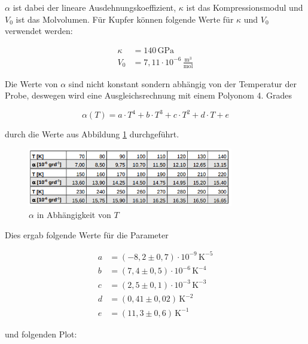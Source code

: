 $\alpha$ ist dabei der lineare Ausdehnungskoeffizient, $\kappa$ ist das Kompressionsmodul und $V_0$ ist das Molvolumen. Für Kupfer können folgende Werte für $\kappa$ und $V_0$ verwendet werden:

\begin{align*}
    \kappa &= 140 \, \mathrm{GPa} \\
    V_0 &= 7, \! 11 \cdot 10^{-6} \, \frac{\mathrm{m}^3}{\mathrm{mol}}
\end{align*}

Die Werte von $\alpha$ sind nicht konstant sondern abhängig von der Temperatur der Probe, deswegen wird eine Ausgleichsrechnung mit einem Polyonom 4. Grades

\begin{equation}
    \alpha (T) = a \cdot T^4 + b \cdot T^3 + c \cdot T^2 + d \cdot T + e
\end{equation}

durch die Werte aus Abbildung \ref{fig:alpha} durchgeführt.

\begin{figure}
    \centering
    \includegraphics[width=0.8\textwidth]{build/alpha.PNG}
    \caption{$\alpha$ in Abhängigkeit von $T$} %
    \label{fig:alpha}
\end{figure}

Dies ergab folgende Werte für die Parameter

\begin{align*}
    a &= (-8, \! 2 \pm 0, \! 7) \cdot 10^{-9} \, \mathrm{K}^{-5} \\
    b &= (7, \! 4 \pm 0, \! 5) \cdot 10^{-6} \, \mathrm{K}^{-4} \\
    c &= (2, \! 5 \pm 0, \! 1) \cdot 10^{-3} \, \mathrm{K}^{-3} \\
    d &= (0, \! 41 \pm 0, \! 02) \, \mathrm{K}^{-2} \\
    e &= (11, \! 3 \pm 0, \! 6) \, \mathrm{K}^{-1}
\end{align*}

und folgenden Plot:

